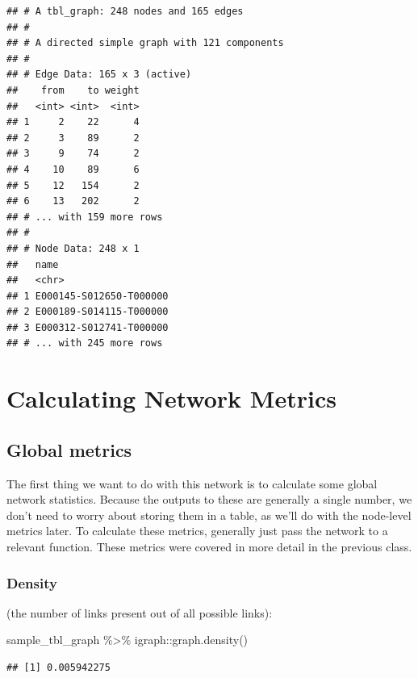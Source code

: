 \documentclass[
]{book}
\newenvironment{Shaded}{\begin{snugshade}}{\end{snugshade}}
\newcommand{\FunctionTok}[1]{\textcolor[rgb]{0.00,0.00,0.00}{#1}}
\newcommand{\NormalTok}[1]{#1}
\newcommand{\SpecialCharTok}[1]{\textcolor[rgb]{0.00,0.00,0.00}{#1}}
\begin{document}
\begin{verbatim}
## # A tbl_graph: 248 nodes and 165 edges
## #
## # A directed simple graph with 121 components
## #
## # Edge Data: 165 x 3 (active)
##    from    to weight
##   <int> <int>  <int>
## 1     2    22      4
## 2     3    89      2
## 3     9    74      2
## 4    10    89      6
## 5    12   154      2
## 6    13   202      2
## # ... with 159 more rows
## #
## # Node Data: 248 x 1
##   name                   
##   <chr>                  
## 1 E000145-S012650-T000000
## 2 E000189-S014115-T000000
## 3 E000312-S012741-T000000
## # ... with 245 more rows
\end{verbatim}

\hypertarget{calculating-network-metrics}{%
\section{Calculating Network Metrics}\label{calculating-network-metrics}}

\hypertarget{global-metrics-1}{%
\subsection{Global metrics}\label{global-metrics-1}}

The first thing we want to do with this network is to calculate some global network statistics. Because the outputs to these are generally a single number, we don't need to worry about storing them in a table, as we'll do with the node-level metrics later. To calculate these metrics, generally just pass the network to a relevant function. These metrics were covered in more detail in the previous class.

\hypertarget{density-1}{%
\subsubsection{Density}\label{density-1}}

(the number of links present out of all possible links):

\begin{Shaded}
\begin{Highlighting}[]
\NormalTok{sample\_tbl\_graph }\SpecialCharTok{\%\textgreater{}\%}\NormalTok{ igraph}\SpecialCharTok{::}\FunctionTok{graph.density}\NormalTok{()}
\end{Highlighting}
\end{Shaded}

\begin{verbatim}
## [1] 0.005942275
\end{verbatim}
\end{document}
